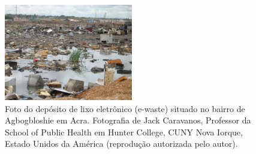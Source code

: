 \begin{frame}
  \frametitle{}
  \begin{figure}[H]
    \centering
    \includegraphics[width=0.5\textwidth]{../../inputs/images/ewaste_jack_caravano.jpg}
    \caption{Foto do depósito de lixo eletrônico (e-waste) situado no bairro 
             de Agbogbloshie em Acra. Fotografia de Jack Caravanos, 
             Professor da School of Public Health em Hunter College, CUNY
             Nova Iorque, Estado Unidos da América 
             (reprodução autorizada pelo autor). \label{fig:ewaste}}
  \end{figure}
\end{frame}

